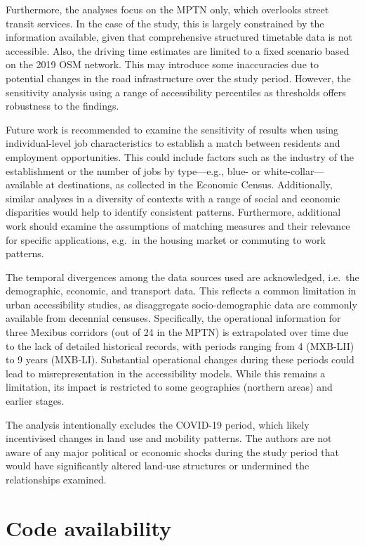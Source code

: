 \documentclass{article}
\begin{document}
Furthermore, the analyses focus on the MPTN only, which overlooks street
transit services. In the case of the study, this is largely constrained
by the information available, given that comprehensive structured
timetable data is not accessible. Also, the driving time estimates are
limited to a fixed scenario based on the 2019 OSM network. This may
introduce some inaccuracies due to potential changes in the road
infrastructure over the study period. However, the sensitivity analysis
using a range of accessibility percentiles as thresholds offers
robustness to the findings.

Future work is recommended to examine the sensitivity of results when
using individual-level job characteristics to establish a match between
residents and employment opportunities. This could include factors such
as the industry of the establishment or the number of jobs by
type---e.g., blue- or white-collar---available at destinations, as
collected in the Economic Census. Additionally, similar analyses in a
diversity of contexts with a range of social and economic disparities
would help to identify consistent patterns. Furthermore, additional work
should examine the assumptions of matching measures and their relevance
for specific applications, e.g.~in the housing market or commuting to
work patterns.

The temporal divergences among the data sources used are acknowledged,
i.e.~the demographic, economic, and transport data. This reflects a
common limitation in urban accessibility studies, as disaggregate
socio-demographic data are commonly available from decennial censuses.
Specifically, the operational information for three Mexibus corridors
(out of 24 in the MPTN) is extrapolated over time due to the lack of
detailed historical records, with periods ranging from 4 (MXB-LII) to 9
years (MXB-LI). Substantial operational changes during these periods
could lead to misrepresentation in the accessibility models. While this
remains a limitation, its impact is restricted to some geographies
(northern areas) and earlier stages.

The analysis intentionally excludes the COVID-19 period, which likely
incentivised changes in land use and mobility patterns. The authors are
not aware of any major political or economic shocks during the study
period that would have significantly altered land-use structures or
undermined the relationships examined.

\section*{Code availability}\label{code-availability}
\end{document}
